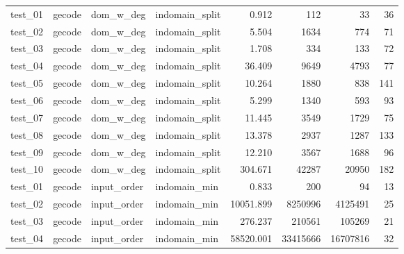 \begin{longtable}{l l l l r r r r}
    \midrule
    test\_01         & gecode          & dom\_w\_deg       & indomain\_split   & 0.912              & 112            & 33                & 36             \\
    test\_02         & gecode          & dom\_w\_deg       & indomain\_split   & 5.504              & 1634           & 774               & 71             \\
    test\_03         & gecode          & dom\_w\_deg       & indomain\_split   & 1.708              & 334            & 133               & 72             \\
    test\_04         & gecode          & dom\_w\_deg       & indomain\_split   & 36.409             & 9649           & 4793              & 77             \\
    test\_05         & gecode          & dom\_w\_deg       & indomain\_split   & 10.264             & 1880           & 838               & 141            \\
    test\_06         & gecode          & dom\_w\_deg       & indomain\_split   & 5.299              & 1340           & 593               & 93             \\
    test\_07         & gecode          & dom\_w\_deg       & indomain\_split   & 11.445             & 3549           & 1729              & 75             \\
    test\_08         & gecode          & dom\_w\_deg       & indomain\_split   & 13.378             & 2937           & 1287              & 133            \\
    test\_09         & gecode          & dom\_w\_deg       & indomain\_split   & 12.210             & 3567           & 1688              & 96             \\
    test\_10         & gecode          & dom\_w\_deg       & indomain\_split   & 304.671            & 42287          & 20950             & 182            \\
    \midrule
    test\_01         & gecode          & input\_order      & indomain\_min     & 0.833              & 200            & 94                & 13             \\
    test\_02         & gecode          & input\_order      & indomain\_min     & 10051.899          & 8250996        & 4125491           & 25             \\
    test\_03         & gecode          & input\_order      & indomain\_min     & 276.237            & 210561         & 105269            & 21             \\
    test\_04         & gecode          & input\_order      & indomain\_min     & 58520.001          & 33415666       & 16707816          & 32             \\

\end{longtable}
